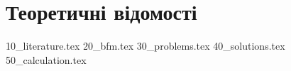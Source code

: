 \chapter{Теоретичні відомості}
{10_literature.tex}
{20_bfm.tex}
{30_problems.tex}
{40_solutions.tex}
{50_calculation.tex}
